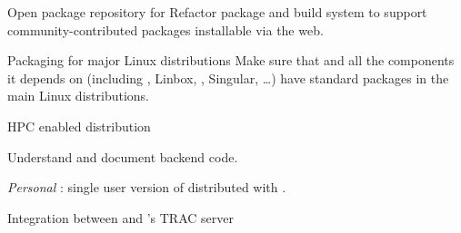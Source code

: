 \begin{workpackage}[id=component-architecture,wphases=0-48!.5,
  title=Component Architecture,lead=UV,
  PSRM=64,UVRM=8,SARM=16, USHRM=4, USORM=6, UORM=4, LLRM=22]
\begin{wpdelivs}
    \begin{wpdeliv}[due=24,id=sage-repository,dissem=PU,nature=OTHER,lead=UV]
      {Open package repository for \Sage} Refactor \Sage package and
      build system to support community-contributed packages
      installable via the web.
    \end{wpdeliv}

    \begin{wpdeliv}[due=48,id=sage-distribution,dissem=PU,nature=OTHER,lead=UV]
      {Packaging for major Linux distributions} Make sure that \Sage and
      all the components it depends on (including \GAP,
      Linbox, \PariGP, Singular, \dots) have standard packages in the
      main Linux distributions.
    \end{wpdeliv}

    \begin{wpdeliv}[due=48,id=hpc-configure,dissem=PU,nature=OTHER]
      {HPC enabled \Sage distribution}
    \end{wpdeliv}

    \begin{wpdeliv}[due=6,id=smc-documentation,dissem=PU,nature=R,lead=PS]
      {Understand and document \SMC backend code.}
    \end{wpdeliv}%

    \begin{wpdeliv}[due=24,id=personal-smc,dissem=PU,nature=OTHER,lead=PS]
      {\emph{Personal} \SMC: single user version of \SMC distributed
        with \Sage.}
    \end{wpdeliv}%

    \begin{wpdeliv}[due=24,id=smc-trac,dissem=PU,nature=OTHER,lead=UV]
      {Integration between \SMC and \Sage's TRAC server}
    \end{wpdeliv}
  \end{wpdelivs}


\end{workpackage}
